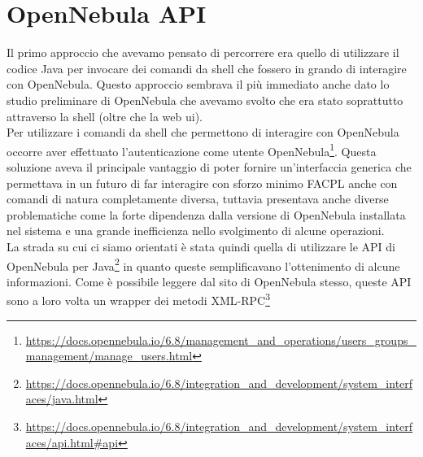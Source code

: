 \section{OpenNebula API}
Il primo approccio che avevamo pensato di percorrere era quello di utilizzare il codice Java per invocare dei comandi da shell che fossero in grando di interagire con OpenNebula. Questo approccio sembrava il più immediato anche dato lo studio preliminare di OpenNebula che avevamo svolto che era stato soprattutto attraverso la shell (oltre che la web ui).\\
Per utilizzare i comandi da shell che permettono di interagire con OpenNebula occorre aver effettuato l'autenticazione come utente OpenNebula\footnote{\url{https://docs.opennebula.io/6.8/management_and_operations/users_groups_management/manage_users.html}}.
Questa soluzione aveva il principale vantaggio di poter fornire un'interfaccia generica che permettava in un futuro di far interagire con sforzo minimo FACPL anche con comandi di natura completamente diversa, tuttavia presentava anche diverse problematiche come la forte dipendenza dalla versione di OpenNebula installata nel sistema e una grande inefficienza nello svolgimento di alcune operazioni.\\

La strada su cui ci siamo orientati è stata quindi quella di utilizzare le API di OpenNebula per Java\footnote{\url{https://docs.opennebula.io/6.8/integration_and_development/system_interfaces/java.html}} in quanto queste semplificavano l'ottenimento di alcune informazioni. Come è possibile leggere dal sito di OpenNebula stesso, queste API sono a loro volta un wrapper dei metodi XML-RPC\footnote{\url{https://docs.opennebula.io/6.8/integration_and_development/system_interfaces/api.html\#api}}\\

